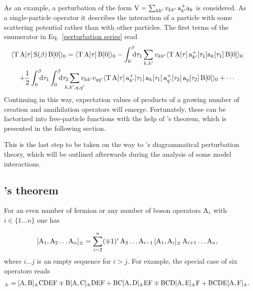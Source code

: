 As an example, a perturbation of the form $\mathrm V = \sum_{k k'} v_{k k'} \, \mathrm
a_{k'}^+ \mathrm a_k$ is considered. As a single-particle operator it describes the
interaction of a particle with some scattering potential rather than with other
particles. The first terms of the enumerator in Eq.~\ref{perturbation series}
read
%
\begin{gather*}
    \av{\op T \, \op A[\tau] \, \op S(\beta) \, \op B[0]}_0 =
    \av{\op T \, \op A[\tau] \, \op B[0]}_0 -
    \int \from 0 \till \beta \D \tau_1
    \sum_{k, k'} v_{k k'}
    \av{
        \op T \, \op A[\tau] \,
        \op a_{k'}^+[\tau_1] \op a_k[\tau_1] \,
        \op B[0]
    }_0 \\ + \frac 1 2
    \int \from 0 \till \beta \D \tau_1
    \int \from 0 \till \beta \D \tau_2
    \sum_{\mathclap{k, k', q, q'}} v_{k k'} v_{q q'}
    \av{
        \op T \, \op A[\tau] \,
        \op a_{k'}^+[\tau_1] \, \op a_k[\tau_1] \,
        \op a_{q'}^+[\tau_2] \, \op a_q[\tau_2] \,
        \op B[0]
    }_0 + \cdots
\end{gather*}
%
Continuing in this way, expectation values of products of a growing number of
creation and annihilation operators will emerge. Fortunately, these can be
factorized into free-particle  functions with the help of
's theorem, which is presented in the following section.

This is the last step to be taken on the way to 's diagrammatical
perturbation theory, which will be outlined afterwards during the analysis of
some model interactions.

\subsection{'s theorem}

For an even number of fermion or any number of boson operators $\mathrm A_i$ with $i
\in \{ 1 \dots n \}$ one has

\begin{equation} \label{left to right}
    [\mathrm A_1, \mathrm A_2 \dots \mathrm A_n]_\pm =
    \sum_{i = 2}^n (\mp 1)^i \,
    \mathrm A_2 \dots \mathrm A_{i - 1} \,
    [\mathrm A_1, \mathrm A_i]_\pm \,
    \mathrm A_{i + 1} \dots \mathrm A_n,
\end{equation}
%
where $i \dots j$ is an empty sequence for $i > j$. For example, the special
case of six operators reads
%
\begin{align*}
        [\op A, \op B \op C \op D \op E \op F]_\pm
    =   [\op A, \op B]_\pm \op C \op D \op E \op F
    \mp \op B [\op A, \op C]_\pm \op D \op E \op F
    +   \op B \op C [\op A, \op D]_\pm \op E \op F
    \mp \op B \op C \op D [\op A, \op E]_\pm \op F
    +   \op B \op C \op D \op E [\op A, \op F]_\pm.
\end{align*}

